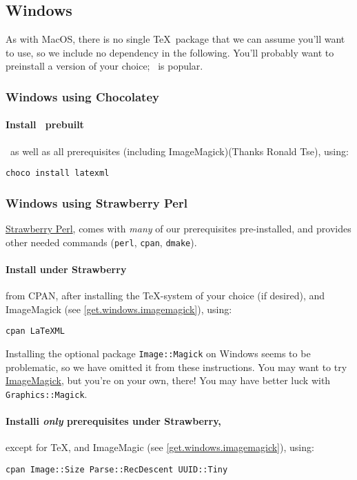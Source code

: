 \documentclass{article}
\begin{document}
\subsection{Windows}\label{get.windows}
As with MacOS, there is no single \TeX\ package that we can assume
you'll want to use, so we include no dependency in the following.
You'll probably want to preinstall a version of your choice;
\MikTeX\ is popular.

\subsubsection{Windows using Chocolatey}\label{get.windows.chocolatey}
\paragraph*{Install \Chocolatey\ prebuilt} \LaTeXML\ as well as all prerequisites
(including ImageMagick)(Thanks Ronald Tse), using:
\begin{lstlisting}[style=shell]
choco install latexml
\end{lstlisting}

\subsubsection{Windows using Strawberry Perl}\label{get.windows.strawberry}
\href{https://strawberryperl.com}{Strawberry Perl},
comes with \emph{many} of our prerequisites pre-installed,
and provides other needed commands (\texttt{perl}, \texttt{cpan}, \texttt{dmake}).

\paragraph*{Install under Strawberry}\label{get.windows.strawberry} from CPAN,
after installing the \TeX-system of your choice (if desired),
and ImageMagick (see \ref{get.windows.imagemagick}),
using:
\begin{lstlisting}[style=shell]
cpan LaTeXML
\end{lstlisting}

Installing the optional package \texttt{Image::Magick} on Windows seems to be problematic,
so we have omitted it from these instructions.
You may want to try \href{https://www.imagemagick.org/}{ImageMagick}, but
you're on your own, there!  You may  have better luck with \texttt{Graphics::Magick}.

\paragraph*{Installi \emph{only} prerequisites  under Strawberry,}\label{get.windows.strawberry.prereq}
except for \TeX, and ImageMagic (see \ref{get.windows.imagemagick}),
using:
\begin{lstlisting}[style=shell]
cpan Image::Size Parse::RecDescent UUID::Tiny
\end{lstlisting}
\end{document}
